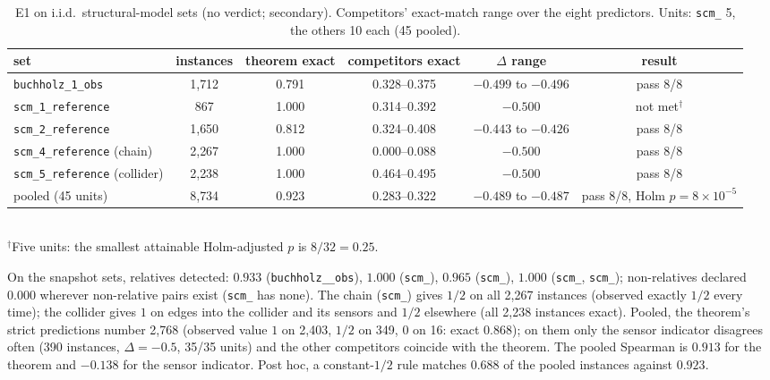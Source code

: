\begin{table}[h]
\caption{E1 on i.i.d.\ structural-model sets (no verdict; secondary). Competitors' exact-match range over the eight predictors. Units: \texttt{scm\_} 5, the others 10 each (45 pooled).}
\label{tab:e1iid}
\centering\footnotesize
\setlength{\tabcolsep}{3pt}
\begin{tabular}{lccccc}
\toprule
set & instances & theorem exact & competitors exact & $\Delta$ range & result \\
\midrule
\texttt{buchholz\_1\_obs} & 1{,}712 & 0.791 & 0.328--0.375 & $-0.499$ to $-0.496$ & pass 8/8 \\
\texttt{scm\_1\_reference} & 867 & 1.000 & 0.314--0.392 & $-0.500$ & not met$^\dagger$ \\
\texttt{scm\_2\_reference} & 1{,}650 & 0.812 & 0.324--0.408 & $-0.443$ to $-0.426$ & pass 8/8 \\
\texttt{scm\_4\_reference} (chain) & 2{,}267 & 1.000 & 0.000--0.088 & $-0.500$ & pass 8/8 \\
\texttt{scm\_5\_reference} (collider) & 2{,}238 & 1.000 & 0.464--0.495 & $-0.500$ & pass 8/8 \\
pooled (45 units) & 8{,}734 & 0.923 & 0.283--0.322 & $-0.489$ to $-0.487$ & pass 8/8, Holm $p=8\times10^{-5}$ \\
\bottomrule
\end{tabular}
\\[2pt]{\footnotesize $^\dagger$Five units: the smallest attainable Holm-adjusted $p$ is $8/32=0.25$.}
\end{table}

On the snapshot sets, relatives detected: $0.933$ (\texttt{buchholz\_\_\allowbreak obs}), $1.000$ (\texttt{scm\_}), $0.965$ (\texttt{scm\_}), $1.000$ (\texttt{scm\_}, \texttt{scm\_}); non-relatives declared $0.000$ wherever non-relative pairs exist (\texttt{scm\_} has none).
The chain (\texttt{scm\_}) gives $1/2$ on all 2{,}267 instances (observed exactly $1/2$ every time); the collider gives $1$ on edges into the collider and its sensors and $1/2$ elsewhere (all 2{,}238 instances exact).
Pooled, the theorem's strict predictions number 2{,}768 (observed value $1$ on 2{,}403, $1/2$ on 349, $0$ on 16: exact $0.868$); on them only the sensor indicator disagrees often (390 instances, $\Delta=-0.5$, 35/35 units) and the other competitors coincide with the theorem. The pooled Spearman is $0.913$ for the theorem and $-0.138$ for the sensor indicator.
Post hoc, a constant-$1/2$ rule matches $0.688$ of the pooled instances against $0.923$.

